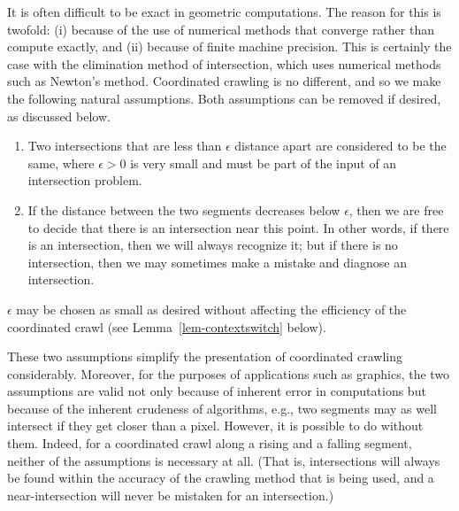 It is often difficult to be exact in geometric computations.
The reason for this is twofold: (i)
because of the use of numerical methods that converge rather
than compute exactly, and (ii) because of finite machine precision.
This is certainly the case with the elimination method of intersection, 
which uses numerical methods such as Newton's method.
Coordinated crawling is no different, and so we make the following natural assumptions.
Both assumptions can be removed if desired, as discussed below.
\begin{enumerate}
\item
	Two intersections that are less than $\epsilon$ distance apart are considered 
	to be the same, where $\epsilon > 0$ is very small and must be part of the input 
	of an intersection problem.
\item
	If the distance between the two segments decreases below $\epsilon$, 
	then we are free to decide that there is an intersection near this point.
        In other words, if there is an intersection, then we will always recognize it;
\label{ass2}
	but if there is no intersection, then we may sometimes make a mistake and 
	diagnose an intersection.
\end{enumerate}
$\epsilon$ may be chosen as small as desired without affecting the efficiency of the 
coordinated crawl (see Lemma~\ref{lem-contextswitch} below).

These two assumptions simplify the presentation of coordinated crawling considerably.
Moreover, for the purposes of applications such as graphics,
the two assumptions are valid not only because of inherent error in computations 
but because of the inherent crudeness of algorithms, e.g., two segments may as well 
intersect if they get closer than a pixel.
However, it is possible to do without them.
Indeed, for a coordinated crawl along a rising and a falling segment,
neither of the assumptions is necessary at all.
(That is, intersections will always be found within the accuracy 
	of the crawling method that is being used, and
	a near-intersection will never be mistaken for an intersection.)
%
%
%

